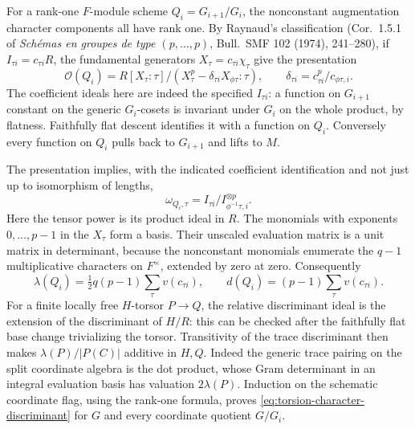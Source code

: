 For a rank-one \(F\)-module scheme \(Q_i=G_{i+1}/G_i\),
the nonconstant augmentation character components all have rank
one. By Raynaud's classification (Cor.~1.5.1 of
\emph{Sch\'emas en groupes de type \((p,\ldots,p)\)},
Bull.~SMF 102 (1974), 241--280), if
\(I_{\tau i}=c_{\tau i}R\), the fundamental generators
\(X_\tau=c_{\tau i}\chi_\tau\) give the presentation
\[
 \mathcal O(Q_i)=
 R[X_\tau:\tau]/(X_\tau^p-\delta_{\tau i}X_{\phi\tau}:\tau),
 \qquad
 \delta_{\tau i}=c_{\tau i}^{p}/c_{\phi\tau,i}.
\]
The coefficient ideals here are indeed the specified
\(I_{\tau i}\): a function on \(G_{i+1}\) constant on the
generic \(G_i\)-cosets is invariant under \(G_i\) on the
whole product, by flatness. Faithfully flat descent identifies
it with a function on \(Q_i\). Conversely every function on
\(Q_i\) pulls back to \(G_{i+1}\) and lifts to \(M\).

The presentation implies, with the indicated coefficient
identification and not just up to isomorphism of lengths,
\begin{equation}\label{eq:torsion-character-cotangent}
 \omega_{Q_i,\tau}=I_{\tau i}/I_{\phi^{-1}\tau,i}^{\otimes p}.
\end{equation}
Here the tensor power is its product ideal in \(R\).
The monomials with exponents \(0,\ldots,p-1\) in the
\(X_\tau\) form a basis. Their unscaled evaluation matrix
is a unit matrix in determinant, because the nonconstant
monomials enumerate the \(q-1\) multiplicative characters
on \(F^\times\), extended by zero at zero. Consequently
\[
 \lambda(Q_i)=\tfrac12 q(p-1)\sum_\tau v(c_{\tau i}),
 \qquad d(Q_i)=(p-1)\sum_\tau v(c_{\tau i}).
\]
For a finite locally free \(H\)-torsor \(P\to Q\), the relative
discriminant ideal is the extension of the discriminant of
\(H/R\): this can be checked after the faithfully flat
base change trivializing the torsor. Transitivity of the
trace discriminant then makes
\(\lambda(P)/|P(C)|\) additive in \(H,Q\).
Indeed the generic trace pairing on the split coordinate
algebra is the dot product, whose Gram determinant in an
integral evaluation basis has valuation \(2\lambda(P)\).
Induction on the schematic coordinate flag, using the
rank-one formula, proves
\eqref{eq:torsion-character-discriminant} for \(G\) and every
coordinate quotient \(G/G_i\).

